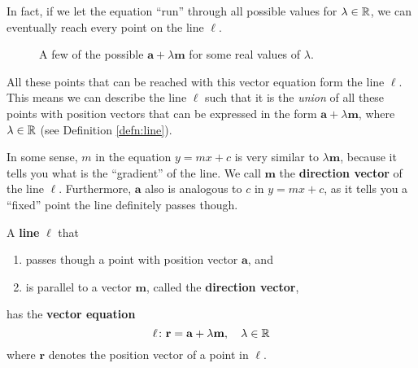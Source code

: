 \documentclass[12pt]{article}
\renewcommand{\vec}{\mathbf}
\begin{document}
\begin{disc}
	In fact, if we let the equation ``run'' through all possible values for \(\lambda \in \mathbb{R}\), we can eventually reach every point on the line \(\ell\).
	\begin{figure}[H]
		\centering
		\caption{A few of the possible \(\vec{a} + \lambda \vec{m}\) for some real values of \(\lambda\).}
	\end{figure}
	All these points that can be reached with this vector equation form the line \(\ell\).
	This means we can describe the line \(\ell\) such that it is the \emph{union} of all these points with position vectors that can be expressed in the form \(\vec{a} + \lambda \vec{m}\), where \(\lambda \in \mathbb{R}\) (see Definition \ref{defn:line}).

	In some sense, \(m\) in the equation \(y = mx + c\) is very similar to \(\lambda \vec{m}\), because it tells you what is the ``gradient'' of the line.
	We call \(\vec{m}\) the \textbf{direction vector} of the line \(\ell\).
	Furthermore, \(\vec{a}\) also is analogous to \(c\) in \(y = mx + c\), as it tells you a ``fixed'' point the line definitely passes though.
\end{disc}

\begin{defn} \label{defn:line}
	A \textbf{line} \(\ell\) that 
	\begin{enumerate}
		\item passes though a point with position vector \(\vec{a}\), and
		\item is parallel to a vector \(\vec{m}\), called the \textbf{direction vector},
	\end{enumerate}
	has the \textbf{vector equation}
	\[ \ell \colon \vec{r} = \vec{a} + \lambda \vec{m}, \quad \lambda \in \R \] 
	where \(\vec{r}\) denotes the position vector of a point in \(\ell\). 
\end{defn}
\end{document}
